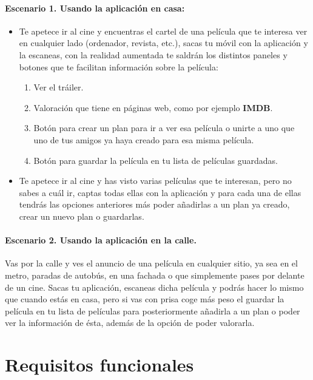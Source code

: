 \paragraph{Escenario 1. Usando la aplicación en casa:\\}
\begin{itemize}
    \item Te apetece ir al cine y encuentras el cartel de una película que te interesa ver en cualquier lado (ordenador, revista, etc.), sacas tu móvil con la aplicación y 
    la escaneas, con la realidad aumentada te saldrán los distintos paneles y botones que te facilitan información sobre la película:
    \begin{enumerate}
        \item Ver el tráiler.
        \item Valoración que tiene en páginas web, como por ejemplo \textbf{IMDB}.
        \item Botón para crear un plan para ir a ver esa película o unirte a uno que uno de tus amigos ya haya creado para esa misma película.
        \item Botón para guardar la película en tu lista de películas guardadas.
    \end{enumerate}
    \item Te apetece ir al cine y has visto varias películas que te interesan, pero no sabes a cuál ir, captas todas ellas con la aplicación 
    y para cada una de ellas tendrás las opciones anteriores más poder añadirlas a un plan ya creado, crear un nuevo plan o guardarlas.
\end{itemize}
\newpage
\paragraph{Escenario 2. Usando la aplicación en la calle.\\}
Vas por la calle y ves el anuncio de una película en cualquier sitio, ya sea en el metro, paradas de autobús, en una fachada o que simplemente pases 
por delante de un cine. Sacas tu aplicación, escaneas dicha película y podrás hacer lo mismo que cuando estás en casa, pero si vas con prisa coge más peso 
el guardar la película en tu lista de películas para posteriormente añadirla a un plan o poder ver la información de ésta, además de la opción de poder valorarla.



\section{Requisitos funcionales}
\label{makereference3.3}

